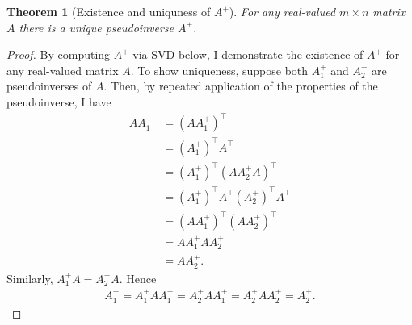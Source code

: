 \documentclass[]{article}
\theoremstyle{plain}
\newtheorem{thm}{Theorem}
\theoremstyle{definition}
\theoremstyle{remark}
\begin{document}
\begin{thm}[Existence and uniquness of $A^+$]
For any real-valued $m \times n$ matrix $A$ there is a unique pseudoinverse
$A^+$.
\end{thm}
\begin{proof}
By computing $A^+$ via SVD below, I demonstrate the existence of $A^+$
for any real-valued matrix $A$.  To show uniqueness, suppose both $A_1^+$ and
$A_2^+$ are pseudoinverses of $A$.  Then, by repeated application of the
properties of the pseudoinverse, I have
\begin{align*}
AA_1^+ &= (AA_1^+)^\top \\
 &= (A_1^+)^\top A^\top \\
 &= (A_1^+)^\top (AA_2^+A)^\top \\
 &= (A_1^+)^\top A^\top (A_2^+)^\top A^\top \\
 &= (AA_1^+)^\top (AA_2^+)^\top \\
 &= AA_1^+AA_2^+ \\
 &= AA_2^+.
\end{align*}
Similarly, $A_1^+A = A_2^+A$. Hence
\begin{align*}
A_1^+ = A_1^+AA_1^+ = A_2^+AA_1^+ = A_2^+AA_2^+ = A_2^+.
\end{align*}
\end{proof}
\end{document}
